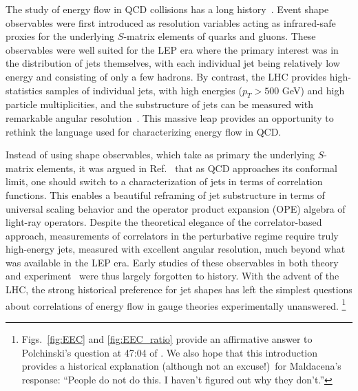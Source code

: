 \documentclass[aps,prl,twocolumn,showpacs,10pt,superscriptaddress,preprintnumbers,nofootinbib,longbibliography]{revtex4-1}
\DeclareRobustCommand{\Figs}[2]{Figs.~\ref{#1} and \ref{#2}}
\begin{document}
The study of energy flow in QCD collisions has a long history~\cite{Bjorken:1969wi,Ellis:1976uc,Georgi:1977sf,Farhi:1977sg,Parisi:1978eg,Donoghue:1979vi,Rakow:1981qn}.
%
Event shape observables were first introduced as resolution variables acting as infrared-safe proxies for the underlying $S$-matrix elements of quarks and gluons.
%
These observables were well suited for the LEP era where the primary interest was in the distribution of jets themselves, with each individual jet being relatively low energy and consisting of only a few hadrons. 
%
By contrast, the LHC provides high-statistics samples of individual jets, with high energies ($p_T>500$ GeV) and high particle multiplicities, and the substructure of jets can be measured with remarkable angular resolution~\cite{Kogler:2018hem,CMS:2020poo,ATLAS:2020gwe}.
%
This massive leap provides an opportunity to rethink the language used for characterizing energy flow in QCD.


Instead of using shape observables, which take as primary the underlying $S$-matrix elements, it was argued in Ref.~\cite{Hofman:2008ar} that as QCD approaches its conformal limit, one should switch to a characterization of jets in terms of correlation functions.
%
This enables a beautiful reframing of jet substructure in terms of universal scaling behavior and the operator product expansion (OPE) algebra of light-ray operators. 
%
Despite the theoretical elegance of the correlator-based approach, measurements of correlators in the perturbative regime require truly high-energy jets, measured with excellent angular resolution, much beyond what was available in the LEP era.
%
Early studies of these observables in both theory~\cite{Basham:1978bw,Basham:1977iq,Basham:1979gh,Basham:1978zq,Konishi:1979cb} and experiment~\cite{SLD:1994idb,L3:1992btq,OPAL:1991uui,TOPAZ:1989yod,TASSO:1987mcs,JADE:1984taa,Fernandez:1984db,Wood:1987uf,CELLO:1982rca,PLUTO:1985yzc} were thus largely forgotten to history.
%
With the advent of the LHC, the strong historical preference for jet shapes has left the simplest questions about correlations of energy flow in gauge theories experimentally unanswered.%
%
\footnote{\Figs{fig:EEC}{fig:EEC_ratio} provide an affirmative answer to Polchinski's question at 47:04 of \cite{MaldacenaKITP}.
%
We also hope that this introduction provides a historical explanation (although not an excuse!)\ for Maldacena's response: ``People do not do this. I haven't figured out why they don't.''}
\end{document}
